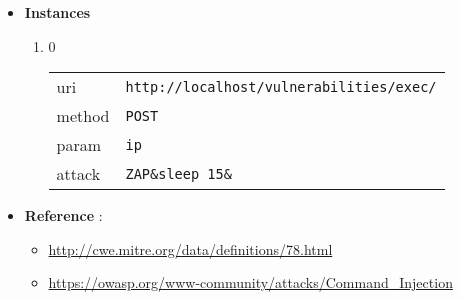 \documentclass[10pt]{article}
\begin{document}
\begin{itemize}
\item[] \textbf{Instances}
\begin{enumerate}
\item[] 0
\begin{tabular}{| l | p{12cm}}
uri & \texttt{http://localhost/vulnerabilities/exec/} \\
method & \texttt{POST} \\
param & \texttt{ip} \\
attack & \texttt{ZAP\&sleep 15\&} \\
\end{tabular}
\end{enumerate}
\item[] \textbf{Reference} : 
\begin{itemize}
\item \url{http://cwe.mitre.org/data/definitions/78.html}
\item \url{https://owasp.org/www-community/attacks/Command\_Injection}
\end{itemize}
\end{itemize}
\end{document}
